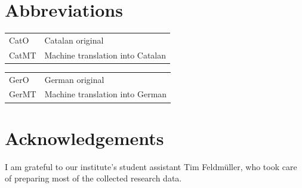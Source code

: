 \documentclass[output=paper]{langscibook}
\begin{document}
\section*{Abbreviations}

\begin{tabularx}{.5\textwidth}{@{}lQ@{}}
{CatO} & Catalan original\\
{CatMT} & Machine translation into Catalan\\
\end{tabularx}%
\begin{tabularx}{.5\textwidth}{@{}lQ@{}}
{GerO} & German original\\
{GerMT} & Machine translation into German
\end{tabularx}

\section*{Acknowledgements}
I am grateful to our institute's student assistant Tim Feldmüller, who took care of preparing most of the collected research data.

{\sloppy\printbibliography[heading=subbibliography,notkeyword=this]}
\end{document}

